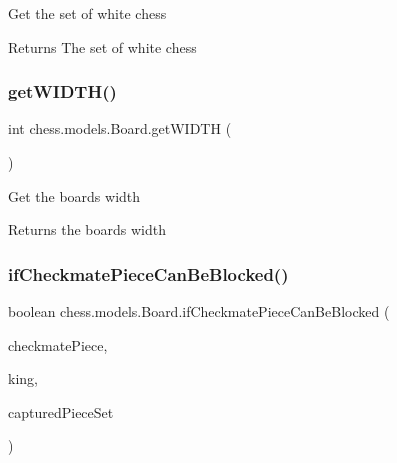 Get the set of white chess

\begin{DoxyReturn}{Returns}
The set of white chess 
\end{DoxyReturn}
\mbox{\label{classchess_1_1models_1_1_board_aeab935c6befad60e51084a78458ebf39}} 
\subsubsection{\texorpdfstring{get\+W\+I\+D\+T\+H()}{getWIDTH()}}
{\footnotesize\ttfamily int chess.\+models.\+Board.\+get\+W\+I\+D\+TH (\begin{DoxyParamCaption}{ }\end{DoxyParamCaption})}

Get the board\textquotesingle{}s width

\begin{DoxyReturn}{Returns}
the board\textquotesingle{}s width 
\end{DoxyReturn}
\mbox{\label{classchess_1_1models_1_1_board_a59a36d62ed2b4ef22b14fda1c10968d8}} 
\subsubsection{\texorpdfstring{if\+Checkmate\+Piece\+Can\+Be\+Blocked()}{ifCheckmatePieceCanBeBlocked()}}
{\footnotesize\ttfamily boolean chess.\+models.\+Board.\+if\+Checkmate\+Piece\+Can\+Be\+Blocked (\begin{DoxyParamCaption}\item[{\mbox{\hyperlink{classchess_1_1models_1_1_chess_piece}{Chess\+Piece}}}]{checkmate\+Piece,  }\item[{\mbox{\hyperlink{classchess_1_1models_1_1_chess_piece}{Chess\+Piece}}}]{king,  }\item[{Set$<$ \mbox{\hyperlink{classchess_1_1models_1_1_chess_piece}{Chess\+Piece}} $>$}]{captured\+Piece\+Set }\end{DoxyParamCaption})}


